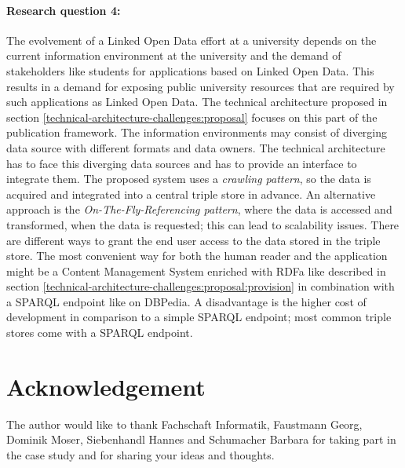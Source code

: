 \documentclass{article}
\begin{document}
\paragraph{Research question 4:} The evolvement of a Linked Open Data effort at a university depends on the current information environment at the university and the demand of stakeholders like students for applications based on Linked Open Data. This results in a demand for exposing public university resources that are required by such applications as Linked Open Data. The technical architecture proposed in section \ref{technical-architecture-challenges:proposal} focuses on this part of the publication framework. The information environments may consist of diverging data source with different formats and data owners. The technical architecture has to face this diverging data sources and has to provide an interface to integrate them. The proposed system uses a \textit{crawling pattern}, so the data is acquired and integrated into a central triple store in advance. An alternative approach is the \textit{On-The-Fly-Referencing pattern}, where the data is accessed and transformed, when the data is requested; this can lead to scalability issues.\cite{heath_linked_2011} There are different ways to grant the end user access to the data stored in the triple store. The most convenient way for both the human reader and the application might be a Content Management System enriched with RDFa like described in section \ref{technical-architecture-challenges:proposal:provision} in combination with a SPARQL endpoint like on DBPedia. A disadvantage is the higher cost of development in comparison to a simple SPARQL endpoint; most common triple stores come with a SPARQL endpoint. 


 
\section{Acknowledgement}
\label{acknowledgement}
The author would like to thank Fachschaft Informatik, Faustmann Georg, Dominik Moser, Siebenhandl Hannes and Schumacher Barbara for taking part in the case study and for sharing your ideas and thoughts.

\newpage
\end{document}
